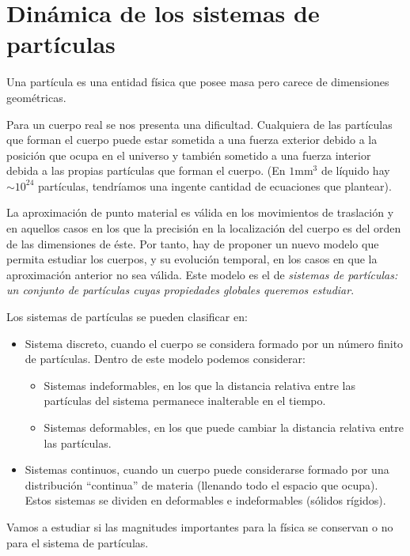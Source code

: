 \chapter{Dinámica de los sistemas de partículas}

\begin{miparrafo}
Una partícula es una entidad física que posee masa pero carece de dimensiones geométricas.

Para un cuerpo real se nos presenta una dificultad. Cualquiera de las partículas que forman el cuerpo puede estar sometida a una fuerza exterior debido a la posición que ocupa en el universo y también sometido a una fuerza interior debida a las propias partículas que forman el cuerpo. (En $1 \text{mm}^3$ de líquido hay $\sim 10^{24}$ partículas, tendríamos una ingente cantidad de ecuaciones que plantear).

La aproximación de punto material es válida en los movimientos de traslación y en aquellos casos en los que la precisión en la localización del cuerpo es del orden de las dimensiones de éste. Por tanto, hay de proponer un nuevo modelo que permita estudiar los cuerpos, y su evolución temporal, en los casos en que la aproximación anterior no sea válida. Este modelo es el de \emph{sistemas de partículas:  un conjunto de partículas cuyas propiedades globales queremos estudiar}. 

Los sistemas de partículas se pueden clasificar en:
\begin{itemize}
	\item Sistema discreto, cuando el cuerpo se considera formado por un número finito de partículas. Dentro de este modelo podemos considerar:
		\begin{itemize}
		\item Sistemas indeformables, en los que la distancia relativa entre las partículas del sistema permanece inalterable en el tiempo.
		\item Sistemas deformables, en los que puede cambiar la distancia relativa entre las partículas.
		\end{itemize}
	\item Sistemas continuos, cuando un cuerpo puede considerarse formado por una distribución “continua” de materia (llenando todo el espacio que ocupa). Estos sistemas se dividen en deformables e indeformables (sólidos rígidos).
\end{itemize}
Vamos a estudiar si las magnitudes importantes para la física se conservan o no para el sistema de partículas.
\end{miparrafo}

